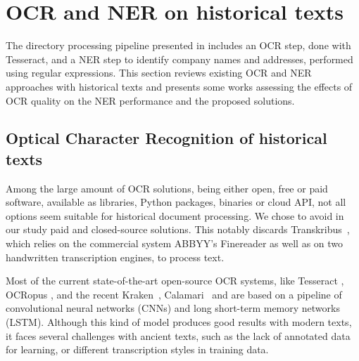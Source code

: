 \section{OCR and NER on historical texts}
\label{sec:related-work}

The directory processing pipeline presented in \cite{bell2020automated} includes an OCR step, done with Tesseract, and a NER step to identify company names and addresses, performed using regular expressions.
This section reviews existing OCR and NER approaches with historical texts and presents some works assessing the effects of OCR quality on the NER performance and the proposed solutions. 

\subsection{Optical Character Recognition of historical texts}
Among the large amount of OCR solutions, being either open, free or paid software, available as libraries, Python packages, binaries or cloud API, not all options seem suitable for historical document processing.
We chose to avoid in our study paid and closed-source solutions.
This notably discards Transkribus~\cite{transkribus}, which relies on the commercial system ABBYY's Finereader as well as on two handwritten transcription engines, to process text.


Most of the current state-of-the-art open-source OCR systems, like Tesseract \cite{smith2007overview}, OCRopus \cite{breuel2008ocropus}, and the recent Kraken~\cite{kraken}, Calamari~\cite{wick_calamari_2020} and \peroocr \cite{kohut2021ts} are based on a pipeline of convolutional neural networks (CNNs) and long short-term memory networks (LSTM).
Although this kind of model produces good results with modern texts, it faces several challenges with ancient texts, such as the lack of annotated data for learning, or different transcription styles in training data.
%


